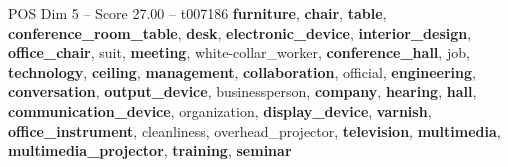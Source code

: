 \begin{textsample}{POS Dim 5 – Score 27.00 – t007186}  \label{ex:f5_pos_031}
\textbf{furniture}, \textbf{chair}, \textbf{table}, \textbf{conference\_room\_table}, \textbf{desk}, \textbf{electronic\_device}, \textbf{interior\_design}, \textbf{office\_chair}, suit, \textbf{meeting}, white-collar\_worker, \textbf{conference\_hall}, job, \textbf{technology}, \textbf{ceiling}, \textbf{management}, \textbf{collaboration}, official, \textbf{engineering}, \textbf{conversation}, \textbf{output\_device}, businessperson, \textbf{company}, \textbf{hearing}, \textbf{hall}, \textbf{communication\_device}, organization, \textbf{display\_device}, \textbf{varnish}, \textbf{office\_instrument}, cleanliness, overhead\_projector, \textbf{television}, \textbf{multimedia}, \textbf{multimedia\_projector}, \textbf{training}, \textbf{seminar}

\end{textsample}
